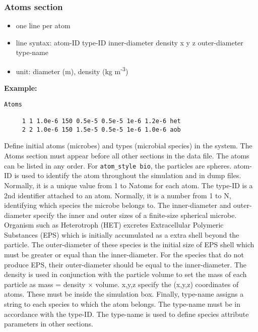 \documentclass[11pt,a4paper,openright]{article}
\begin{document}
\subsubsection{Atoms section}
\label{satom}

\begin{itemize} [nosep]
    \item one line per atom
    \item line syntax: atom-ID {} type-ID {} inner-diameter {} density {} x {} y {} z {} outer-diameter {} type-name
    \item unit: diameter (m), density (kg m\textsuperscript{-3}) \\
\end{itemize} 

\textbf{Example:}
\begin{Verbatim}[frame=single]
   Atoms
   
     1 1 1.0e-6 150 0.5e-5 0.5e-5 1e-6 1.2e-6 het
     2 2 1.0e-6 150 1.5e-5 0.5e-5 1e-6 1.0e-6 aob

\end{Verbatim}

Define initial atoms (microbes) and types (microbial species) in the system. The Atoms section must appear before all other sections in the data file. The atoms can be listed in any order. For {\tt atom\_style bio}, the particles are spheres. atom-ID is used to identify the atom throughout the simulation and in dump files. Normally, it is a unique value from 1 to Natoms for each atom. The type-ID is a 2nd identifier attached to an atom. Normally, it is a number from 1 to N, identifying which species the microbe belongs to. The inner-diameter and outer-diameter specify the inner and outer sizes of a finite-size spherical microbe. Organism such as Heterotroph (HET) excretes Extracellular Polymeric Substances (EPS) which is initially
accumulated as a extra shell beyond the particle. The outer-diameter of these species is the initial size of EPS shell which must be greater or equal than the inner-diameter. For the species that do not produce EPS, their outer-diameter should be equal to the inner-diameter. The density is used in conjunction with the particle volume to set the mass of each particle as mass = density $\times$ volume. x,y,z specify the (x,y,z) coordinates of atoms. These must be inside the simulation box. Finally, type-name assigns a string to each species to which the atom belongs. The type-name must be in accordance with the type-ID. The type-name is used to define species attribute parameters in other sections.
\end{document}
